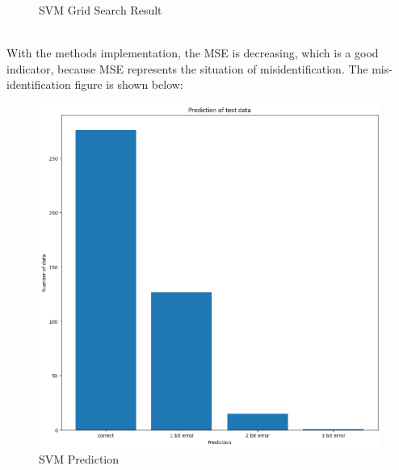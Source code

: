\documentclass[conference]{IEEEtran}
\begin{document}
{\begin{figure}[h]
\begin{center}
	\caption{SVM Grid Search Result}
	\end{center}
	\end{figure}\\
With the methods implementation, the MSE is decreasing, which is a good indicator, because MSE represents the situation of misidentification.
The mis-identification figure is shown below:
	\begin{figure}[h]
	\label{fig:foo}
	\begin{center}
	\includegraphics[scale=0.4]{SVMPrediction.png}
	\caption{SVM Prediction}
	\end{center}
	\end{figure}\\

\pagebreak

}
\end{document}
